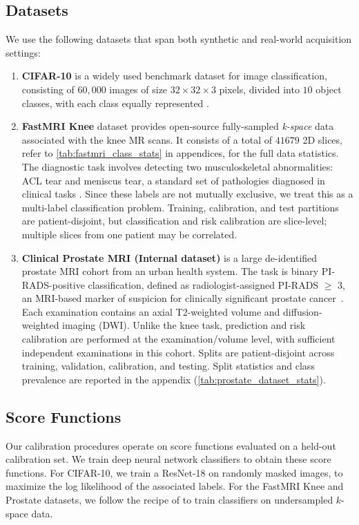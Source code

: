 \subsection{Datasets}
We use the following datasets that span both synthetic and real-world acquisition settings:
\begin{enumerate}[noitemsep]
    \item {\bf CIFAR-10} is a widely used benchmark dataset for image classification, consisting of $60,000$ images of size $32 \times 32 \times 3$ pixels, divided into $10$ object classes, with each class equally represented \citep{cifar10}. 
    
    \item {\bf FastMRI Knee} dataset  \citep{zbontar2018fastmri} provides open-source fully-sampled \textit{k-space} data associated with the knee MR scans. It consists of a total of $41679$ 2D slices, refer to \cref{tab:fastmri_class_stats} in appendices, for the full data statistics. The diagnostic task involves detecting two musculoskeletal abnormalities: {ACL tear} and {meniscus tear}, a standard set of pathologies diagnosed in clinical tasks \citep{singhal2023feasibility,ASMR}. Since these labels are not mutually exclusive, we treat this as a multi-label classification problem. Training, calibration, and test partitions are patient-disjoint, but classification and risk calibration are slice-level; multiple slices from one patient may be correlated.
    
    \item {\bf Clinical Prostate MRI (Internal dataset)} is a large de-identified prostate MRI cohort from an urban health system. The task is binary PI-RADS-positive classification, defined as radiologist-assigned PI-RADS $\geq$ 3, an MRI-based marker of suspicion for clinically significant prostate cancer~\citep{turkbey2019pirads}. Each examination contains an axial T2-weighted volume and diffusion-weighted imaging (DWI). Unlike the knee task, prediction and risk calibration are performed at the examination/volume level, with sufficient independent examinations in this cohort. Splits are patient-disjoint across training, validation, calibration, and testing. Split statistics and class prevalence are reported in the appendix (\cref{tab:prostate_dataset_stats}).

\end{enumerate}

\subsection{Score Functions}
Our calibration procedures operate on score functions evaluated on a held-out calibration set. We train deep neural network classifiers to obtain these score functions. For CIFAR-10, we train a ResNet-18 \citep{he2016deep} on randomly masked images, to maximize the log likelihood of the associated labels. For the FastMRI Knee and Prostate datasets, we follow the recipe of \citet{singhal2023feasibility} to train classifiers on undersampled $k$-space data.

